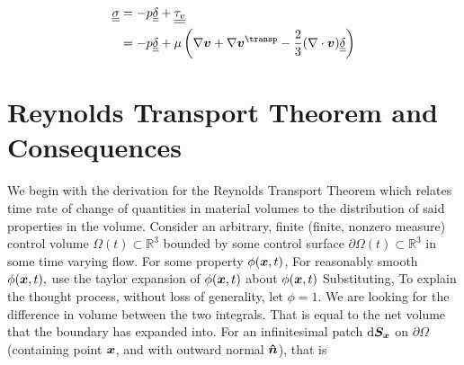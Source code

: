 \begin{equation}
\begin{split}
\tensor{\sigma}&= -p\tensor{\delta}+\tensor{\tau_v} \\
&= -p\tensor{\delta} + \mu\left(\del\vect{v}+\del\vect{v}^\transp - \frac{2}{3}(\del\cdot\vect{v})\tensor{\delta}\right)
\end{split}
\end{equation}
\section{Reynolds Transport Theorem and Consequences}
We begin with the derivation for the Reynolds Transport Theorem which relates time rate of change of quantities in material volumes to the distribution of said properties in the volume. Consider an arbitrary, finite (finite, nonzero measure) control volume $\Omega(t)\subset\mathbb{R}^3$ bounded by some control surface $\partial\Omega(t)\subset\mathbb{R}^3$ in some time varying flow.
For some property $\phi(\boldsymbol{x},t)$,
For reasonably smooth  $\phi(\boldsymbol{x},t),$ use the taylor expansion of $\phi(\boldsymbol{x},t)$ about $\phi(\boldsymbol{x},t)$
Substituting,
To explain the thought process, without loss of generality, let $\phi=1$. We are looking for the difference in volume between the two integrals. That is equal to the net volume that the boundary has expanded into. For an infinitesimal patch $\mathrm{d} \boldsymbol{S_x}$ on $\partial\Omega$ (containing point $\boldsymbol{x}$, and with outward normal $\boldsymbol{\hat{n}}$), that is
